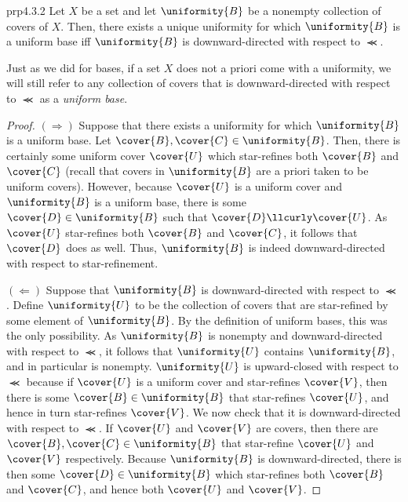 \begin{prp}{}{prp4.3.2}
Let $X$ be a set and let $\uniformity{B}$ be a nonempty collection of covers of $X$.  Then, there exists a unique uniformity for which $\uniformity{B}$ is a uniform base iff $\uniformity{B}$ is downward-directed with respect to $\llcurly$.
\begin{rmk}
Just as we did for bases, if a set $X$ does not a priori come with a uniformity, we will still refer to any collection of covers that is downward-directed with respect to $\llcurly$ as a \emph{uniform base}.
\end{rmk}
\begin{proof}
$(\Rightarrow )$ Suppose that there exists a uniformity for which $\uniformity{B}$ is a uniform base.  Let $\cover{B},\cover{C}\in \uniformity{B}$.  Then, there is certainly some uniform cover $\cover{U}$ which star-refines both $\cover{B}$ and $\cover{C}$ (recall that covers in $\uniformity{B}$ are a priori taken to be uniform covers).  However, because $\cover{U}$ is a uniform cover and $\uniformity{B}$ is a uniform base, there is some $\cover{D}\in \uniformity{B}$ such that $\cover{D}\llcurly \cover{U}$.  As $\cover{U}$ star-refines both $\cover{B}$ and $\cover{C}$, it follows that $\cover{D}$ does as well.  Thus, $\uniformity{B}$ is indeed downward-directed with respect to star-refinement.

\blankline
\noindent
$(\Leftarrow )$ Suppose that $\uniformity{B}$ is downward-directed with respect to $\llcurly$.  Define $\uniformity{U}$ to be the collection of covers that are star-refined by some element of $\uniformity{B}$.  By the definition of uniform bases, this was the only possibility.  As $\uniformity{B}$ is nonempty and downward-directed with respect to $\llcurly$, it follows that $\uniformity{U}$ contains $\uniformity{B}$, and in particular is nonempty.  $\uniformity{U}$ is upward-closed with respect to $\llcurly$ because if $\cover{U}$ is a uniform cover and star-refines $\cover{V}$, then there is some $\cover{B}\in \uniformity{B}$ that star-refines $\cover{U}$, and hence in turn star-refines $\cover{V}$.  We now check that it is downward-directed with respect to $\llcurly$.  If $\cover{U}$ and $\cover{V}$ are covers, then there are $\cover{B},\cover{C}\in \uniformity{B}$ that star-refine $\cover{U}$ and $\cover{V}$ respectively.  Because $\uniformity{B}$ is downward-directed, there is then some $\cover{D}\in \uniformity{B}$ which star-refines both $\cover{B}$ and $\cover{C}$, and hence both $\cover{U}$ and $\cover{V}$.
\end{proof}
\end{prp}
